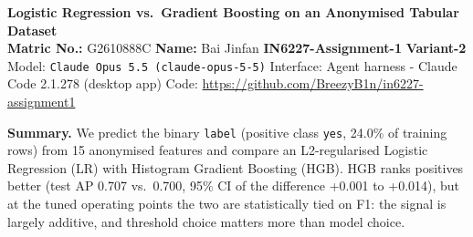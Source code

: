\documentclass[10pt]{article}
\begin{document}
\begin{center}
{\large\bfseries Logistic Regression vs.\ Gradient Boosting on an Anonymised Tabular Dataset}\\[2pt]
\textbf{Matric No.:} G2610888C \quad \textbf{Name:} Bai Jinfan \quad \textbf{IN6227-Assignment-1} \quad \textbf{Variant-2}\\[1pt]
{\footnotesize Model: \texttt{Claude Opus 5.5 (claude-opus-5-5)} \textbar{} Interface: Agent harness - Claude Code 2.1.278 (desktop app) \textbar{} Code: \url{https://github.com/BreezyB1n/in6227-assignment1}}
\end{center}
\vspace{-4pt}
{\small \textbf{Summary.} We predict the binary \texttt{label} (positive class \texttt{yes}, 24.0\% of training rows) from 15 anonymised features and compare an L2-regularised Logistic Regression (LR) with Histogram Gradient Boosting (HGB). HGB ranks positives better (test AP 0.707 vs.\ 0.700, 95\% CI of the difference +0.001 to +0.014), but at the tuned operating points the two are statistically tied on F1: the signal is largely additive, and threshold choice matters more than model choice.}
\end{document}

